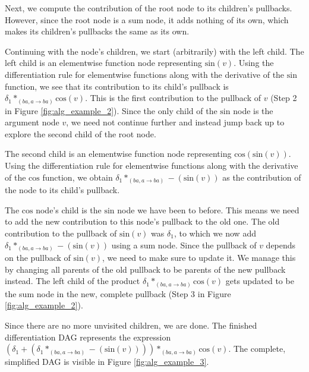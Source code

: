 \documentclass[12pt, a4paper]{report}
\begin{document}
Next, we compute the contribution of the root node to its children's pullbacks.
However, since the root node is a sum node, it adds nothing of its own, which makes its children's pullbacks the same as its own.

Continuing with the node's children, we start (arbitrarily) with the left child.
The left child is an elementwise function node representing $\text{sin}(v)$.
Using the differentiation rule for elementwise functions along with the derivative of the $\text{sin}$ function, we see that its contribution to its child's pullback is $\delta_1 *_{(ba,a \rightarrow ba)} \text{cos}(v)$.
This is the first contribution to the pullback of $v$ (Step 2 in Figure \ref{fig:alg_example_2}).
Since the only child of the $\text{sin}$ node is the argument node $v$, we need not continue further and instead jump back up to explore the second child of the root node.

The second child is an elementwise function node representing $\text{cos}(\text{sin}(v))$.
Using the differentiation rule for elementwise functions along with the derivative of the $\text{cos}$ function, we obtain $\delta_1 *_{(ba,a \rightarrow ba)} -(\text{sin}(v))$ as the contribution of the node to its child's pullback.

The $\text{cos}$ node's child is the $\text{sin}$ node we have been to before.
This means we need to add the new contribution to this node's pullback to the old one.
The old contribution to the pullback of $\text{sin}(v)$ was $\delta_1$, to which we now add $\delta_1 *_{(ba,a \rightarrow ba)} -(\text{sin}(v))$ using a sum node.
Since the pullback of $v$ depends on the pullback of $\text{sin}(v)$, we need to make sure to update it.
We manage this by changing all parents of the old pullback to be parents of the new pullback instead.
The left child of the product $\delta_1 *_{(ba,a \rightarrow ba)} \text{cos}(v)$ gets updated to be the sum node in the new, complete pullback (Step 3 in Figure \ref{fig:alg_example_2}).

Since there are no more unvisited children, we are done.
The finished differentiation DAG represents the expression $(\delta_1 + (\delta_1 *_{(ba,a \rightarrow ba)} -(\text{sin}(v)))) *_{(ba,a \rightarrow ba)} \text{cos}(v)$.
The complete, simplified DAG is visible in Figure \ref{fig:alg_example_3}.
\end{document}
